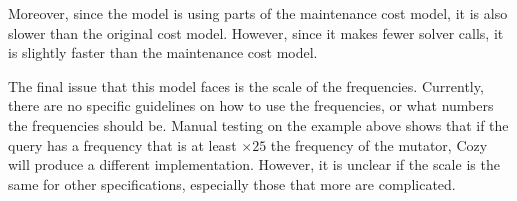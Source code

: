 Moreover, since the model is using parts of the maintenance cost model, it is
also slower than the original cost model. However, since it makes fewer solver
calls, it is slightly faster than the maintenance cost model.

The final issue that this model faces is the scale of the frequencies. Currently,
there are no specific guidelines on how to use the frequencies, or what numbers
the frequencies should be. Manual testing on the example above shows that if the
query has a frequency that is at least $\times 25$ the frequency of the mutator,
Cozy will produce a different implementation. However, it is unclear if the
scale is the same for other specifications, especially those that more are
complicated.
